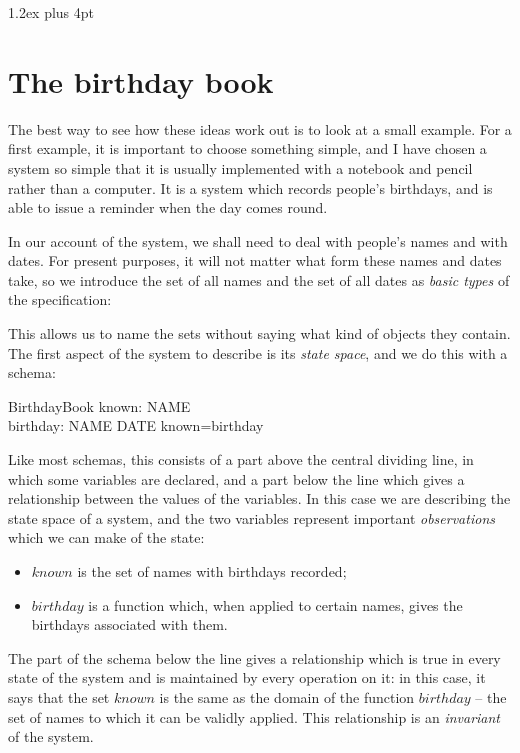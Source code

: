 \documentclass{llncs}
\begin{document}
\parindent 0pt
\parskip 1.2ex plus 4pt

\section{The birthday book}\label{bb}

The best way to see how these ideas work out is to look at a
small example. For a first example, it is important to
choose something simple, and I have chosen a system so
simple that it is usually implemented with a notebook and
pencil rather than a computer. It is a system which records
people's birthdays, and is able to issue a reminder when the
day comes round.

In our account of the system, we shall need to deal with people's
names and with dates. For present purposes, it will not matter what
form these names and dates take, so we introduce the set of all names
and the set of all dates as {\em basic types\/} of the specification:
\begin{zed} \end{zed}
This allows us to name the sets without saying what kind of objects
they contain.
The first aspect of the system to describe is its {\em state space\/},
and we do this with a schema:
\begin{schema}{BirthdayBook}
    known: \power NAME \\
    birthday: NAME \pfun DATE
\where
    known=\dom birthday
\end{schema}
Like most schemas, this consists of a part above the central
dividing line, in which some variables are declared, and a
part below the line which gives a relationship between the
values of the variables. In this case we are describing the
state space of a system, and the two variables represent
important {\em observations\/} which we can make of the
state:
\begin{itemize}
\item $known$ is the set of names with birthdays recorded;
\item $birthday$ is a function which, when applied to certain
names, gives the birthdays associated with them.
\end{itemize}
The part of the schema below the line gives a relationship
which is true in every state of the system and is maintained
by every operation on it: in this case, it says that the set
$known$ is the same as the domain of the function $birthday$
-- the set of names to which it can be validly applied.
This relationship is an {\em invariant\/} of the system.
\end{document}
